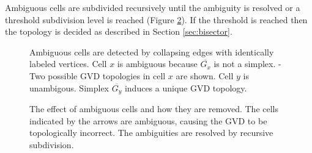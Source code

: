 \documentclass{egpubl}
\begin{document}
Ambiguous cells are subdivided recursively until the ambiguity is resolved or a threshold subdivision level is reached (Figure \ref{fig:bisector-ambiguity}).  If the threshold is reached then the topology is decided as described in Section \ref{sec:bisector}.

\begin{figure}
  \centering
  \caption{
Ambiguous cells are detected by collapsing edges with identically labeled vertices.
    \protect{} Cell $x$ is ambiguous because $\overline{G_x}$ is not a simplex.
    \protect{}-\protect{} Two possible GVD topologies in cell $x$ are shown.
    \protect{} Cell $y$ is unambigous.
    \protect{} Simplex $\overline{G_y}$ induces a unique GVD topology.
  }
  \label{fig:ambiguous}
\end{figure}

\begin{figure}
  \centering
  \hspace{1cm}
  \caption{The effect of ambiguous cells and how they are removed.
    \protect{} The cells indicated by the arrows are ambiguous, causing the GVD to be topologically incorrect.
    \protect{} The ambiguities are resolved by recursive subdivision.}
  \label{fig:bisector-ambiguity}
\end{figure}
\end{document}
